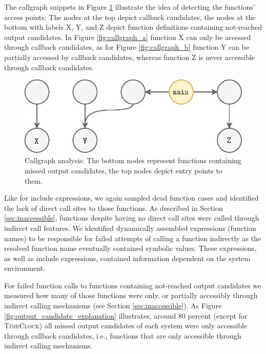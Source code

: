 \documentclass[preprint]{sig-alternate-05-2015}
\begin{document}
The callgraph snippets in Figure \ref{fig:callgraph} illustrate the idea of detecting the functions’ access points: The nodes at the top depict callback candidates, the nodes at the bottom with labels X, Y, and Z depict function definitions containing not-reached output candidates. In Figure \ref{fig:callgraph_a} function X can only be accessed through callback candidates, as for Figure \ref{fig:callgraph_b} function Y can be partially accessed by callback candidates, whereas function Z is never accessible through callback candidates.

\begin{figure}[t!]
	\centering
	\includegraphics[scale=0.55]{images-paper/callgraph_cases}
    \caption{Callgraph analysis: The bottom nodes represent functions containing missed output candidates, the top nodes depict entry points to them.}
    \label{fig:callgraph}
\end{figure}

Like for include expressions, we again sampled dead function cases and identified the lack of direct call sites to those functions. As described in Section \ref{sec:inaccessible}, functions despite having no direct call sites were called through indirect call features. We identified dynamically assembled expressions (function names) to be responsible for failed attempts of calling a function indirectly as the resolved function name eventually contained symbolic values. These expressions, as well as include expressions, contained information dependent on the system environment.

For failed function calls to functions containing not-reached output candidates we measured how many of those functions were only, or partially accessibly through indirect calling mechanisms (see Section \ref{sec:inaccessible}). As Figure \ref{fig:output_candidate_explanation} illustrates, around 80 percent (except for \textsc{TimeClock}) all missed output candidates of each system were only accessible through callback candidates, i.e., functions that are only accessible through indirect calling mechanisms.
\end{document}
